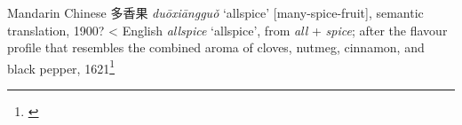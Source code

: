 \begin{etymology}\label{ety:duoxiangguo}
Mandarin Chinese {多香果} \textit{duōxiāngguǒ} `allspice' [many-spice-fruit], semantic translation, 1900?
< English \textit{allspice} `allspice', from \textit{all} + \textit{spice}; after the flavour profile that resembles the combined aroma of cloves, nutmeg, cinnamon, and black pepper, 1621\footnote{\textcite{mdbg}}
\end{etymology}